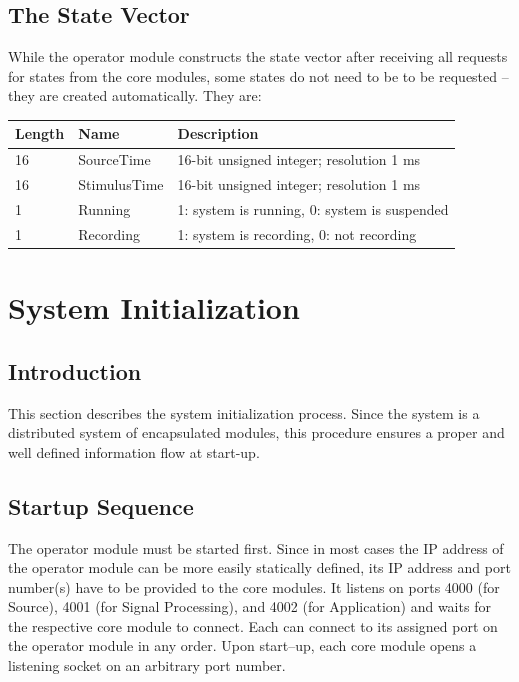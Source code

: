 \documentclass[letterpaper,oneside,12pt]{book}
\begin{document}
\subsection{The State Vector}

While the operator module constructs the state vector after receiving 
all requests for states from the core modules, some states do not need to be
to be requested -- they are created automatically. They are:
\\[2ex]
\begin{tabular}{|l|l|l|}
 \hline
 \textbf{Length} & \textbf{Name} & \textbf{Description}\\
 \hline
 16 & SourceTime & 16-bit unsigned integer; resolution 1 ms \\  
 \hline
 16 & StimulusTime & 16-bit unsigned integer; resolution 1 ms \\  
 \hline
 1 & Running & 1: system is running, 0: system is suspended\\  
 \hline
 1 & Recording & 1: system is recording, 0: not recording\\  
 \hline
\end{tabular}


\section{System Initialization}
\label{system_init}

\subsection{Introduction}

This section describes the system initialization process. Since the system is a 
distributed system of encapsulated modules, this procedure ensures a proper and 
well defined information flow at start-up.

\subsection{Startup Sequence}

The operator module must be started first. Since in most cases the IP address of 
the operator module can be more easily statically defined, its IP address and 
port number(s) have to be provided to the core modules. It listens on ports 4000 
(for Source), 4001 (for Signal Processing), and 4002 (for Application) and 
waits for the respective core module to connect. Each can connect to its 
assigned port on the operator module in any order. Upon start--up, each core 
module opens a listening socket on an arbitrary port number.
\end{document}
